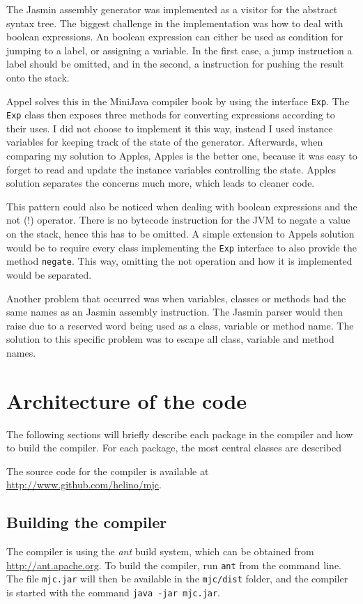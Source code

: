 \documentclass[11pt,oneside,a4paper]{article}
\newcommand{\code}[1]{\texttt{#1}}
\newcommand{\file}[1]{\texttt{#1}}
\newcommand{\folder}[1]{\texttt{#1}}
\newcommand{\command}[1]{\texttt{#1}}
\begin{document}
The Jasmin assembly generator was implemented as a visitor for the abstract
syntax tree. The biggest challenge in the implementation was how to deal with
boolean expressions. An boolean expression can either be used as condition for
jumping to a label, or assigning a variable. In the first case, a jump
instruction a label should be omitted, and in the second, a instruction for
pushing the result onto the stack.

Appel solves this in the MiniJava compiler book by using the interface
\code{Exp}. The \code{Exp} class then exposes three methods for converting
expressions according to their uses. 
I did not choose to implement it this way, instead I used instance variables
for keeping track of the state of the generator. Afterwards, when comparing my
solution to Apples, Apples is the better one, because it was easy to forget to
read and update the instance variables controlling the state. Apples solution
separates the concerns much more, which leads to cleaner code.

This pattern could also be noticed when dealing with boolean expressions and
the not (!) operator. There is no bytecode instruction for the JVM to negate a
value on the stack, hence this has to be omitted. A simple extension to Appels
solution would be to require every class implementing the \code{Exp}
interface to also provide the method \code{negate}. This way, omitting the
not operation and how it is implemented would be separated.

Another problem that occurred was when variables, classes or methods had the
same names as an Jasmin assembly instruction. The Jasmin parser would then
raise due to a reserved word being used as a class, variable or method name. The
solution to this specific problem was to escape all class, variable and method
names.
\section{Architecture of the code}
The following sections will briefly describe each package in the compiler and
how to build the compiler. For each package, the most central classes are
described

The source code for the compiler is available at \\
\href{http://www.github.com/helino/mjc}{http://www.github.com/helino/mjc}.

\subsection{Building the compiler}
The compiler is using the \emph{ant} build system, which can be obtained from 
\href{http://ant.apache.org}{http://ant.apache.org}. To build the compiler, run
\command{ant} from the command line. 
The file \file{mjc.jar} will then be available in the
\folder{mjc/dist} folder, and the compiler is started with the command 
\command{java -jar mjc.jar}.
\end{document}
